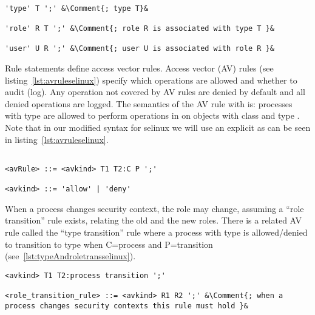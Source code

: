 \lstset{language=selinux}
\begin{lstlisting}[frame=single, caption={Declaration Statements},label={lst:declsselinux}]

'type' T ';' &\Comment{; type T}&

'role' R T ';' &\Comment{; role R is associated with type T }&

'user' U R ';' &\Comment{; user U is associated with role R }&

\end{lstlisting}

Rule statements define access vector rules. Access vector (AV) rules (see listing~\ref{lst:avruleselinux}) specify which operations are allowed and whether to audit (log). Any operation not covered by AV rules are denied by default and all denied operations are logged. The semantics of the AV rule with   is: processes with type  are allowed to perform operations in  on objects with class  and type . Note that in our modified syntax for \ac{selinux} we will use an explicit  as can be seen in listing~\ref{lst:avruleselinux}.

\lstset{language=selinux}
\begin{lstlisting}[frame=single, caption={AV Rule},label={lst:avruleselinux}]

<avRule> ::= <avkind> T1 T2:C P ';'

<avkind> ::= 'allow' | 'deny'
\end{lstlisting}

When a process changes security context, the role may change, assuming a ``role transition'' rule exists, relating the old and the new roles. There is a related AV rule called the ``type transition'' rule where a process with type  is allowed/denied to transition to type  when C=process and P=transition (see~\ref{lst:typeAndroletransselinux}).

\lstset{mathescape, language=AST} 
\begin{minipage}[c]{0.95\textwidth}
\begin{lstlisting}[frame=single, caption={Type Transition and Role-Allow Rules},label={lst:typeAndroletransselinux}]
<avkind> T1 T2:process transition ';'

<role_transition_rule> ::= <avkind> R1 R2 ';' &\Comment{; when a process changes security contexts this rule must hold }&
\end{lstlisting}
\end{minipage}

